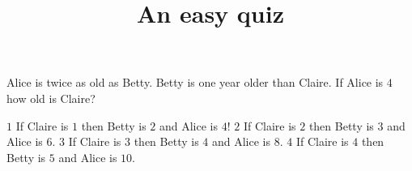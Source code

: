 \documentclass{mathquiz}
\title{An easy quiz}
\begin{document}
  \begin{question}
     Alice is twice as old as Betty.
     Betty is one year older than Claire.
     If Alice is $4$ how old is Claire?

     \begin{choice}
       \correct $1$
         \response If Claire is $1$ then Betty is $2$ and Alice is $4$!
       \incorrect $2$
         \response If Claire is $2$ then Betty is $3$ and Alice is $6$.
       \incorrect $3$
         \response If Claire is $3$ then Betty is $4$ and Alice is $8$.
       \incorrect $4$
         \response If Claire is $4$ then Betty is $5$ and Alice is $10$.
     \end{choice}
  \end{question}
\end{document}
